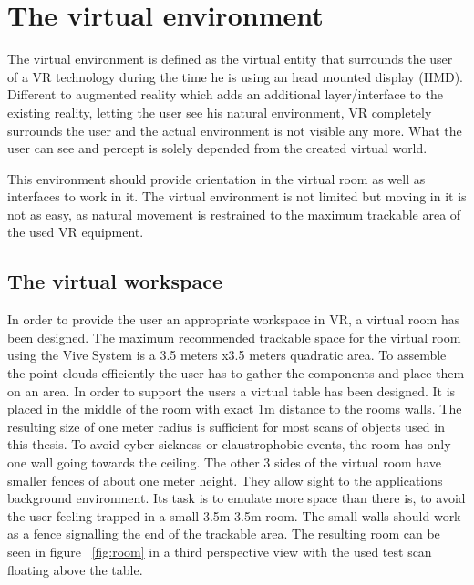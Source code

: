 \documentclass[hyperref,english,bachelorofscience,bibnum,twoside]{cgvpub}
\begin{document}
\section{The virtual environment}

The virtual environment is defined as the virtual entity that surrounds the user of a VR technology during the time he is using an head mounted display (HMD). Different to augmented reality which adds an additional layer/interface to the existing reality, letting the user see his natural environment, VR completely surrounds the user and the actual environment is not visible any more. What the user can see and percept is solely depended from the created virtual world\cite{Milgram1995}.

This environment should provide orientation in the virtual room as well as interfaces to work in it. The virtual environment is not limited but moving in it is not as easy, as natural movement is restrained to the maximum trackable area of the used VR equipment. 

\subsection{The virtual workspace}

In order to provide the user an appropriate workspace in VR, a virtual room has been designed. The maximum recommended trackable space for the virtual room using the Vive System is a 3.5 meters x3.5 meters quadratic area.\cite{vivehelp}
To assemble the point clouds efficiently the user has to gather the components and place them on an area. In order to support the users a virtual table has been designed. It is placed in the middle of the room with exact 1m distance to the rooms walls. The resulting size of one meter radius is sufficient for most scans of objects used in this thesis.
To avoid cyber sickness or claustrophobic events, the room has only one wall going towards the ceiling. The other 3 sides of the virtual room have smaller fences of about one meter height. They allow sight to the applications background environment. Its task is to emulate more space than there is, to avoid the user feeling trapped in a small 3.5m 3.5m room. The small walls should work as a fence signalling the end of the trackable area. The resulting room can be seen in figure ~\ref{fig:room} in a third perspective view with the used test scan floating above the table.
\end{document}
